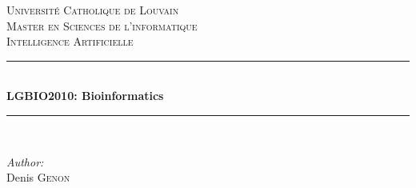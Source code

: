 \documentclass[12pt]{article} %
\begin{document}

\begin{titlepage}

\newcommand{\HRule}{\rule{\linewidth}{0.5mm}} %

\center %

\textsc{\LARGE Université Catholique de Louvain}\\[1.5cm] %
\textsc{\Large Master en Sciences de l'informatique}\\[0.5cm] %
\textsc{\large Intelligence Artificielle}\\[0.5cm] %

\HRule \\[0.4cm]
{ \huge \bfseries LGBIO2010: Bioinformatics}\\[0.4cm] %
\HRule \\[1.5cm]

\begin{minipage}{0.4\textwidth}
\begin{flushleft} \large
\emph{Author:}\\
Denis \textsc{Genon} %
\end{flushleft}
\end{minipage}
~



\vfill %

\end{titlepage}


\tableofcontents %

\end{document}
